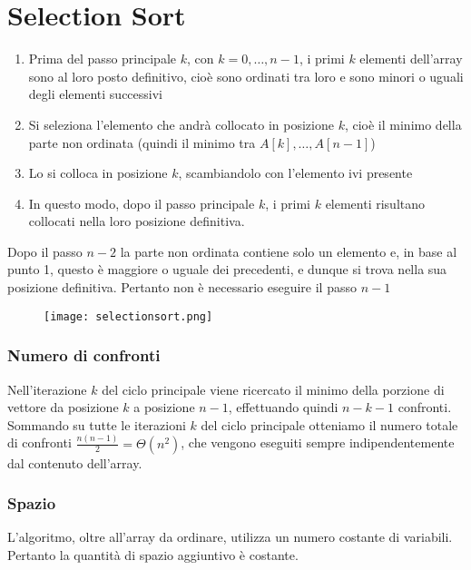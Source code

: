 \section{Selection Sort}
\begin{enumerate}
    \item Prima del passo principale $k$, con $k = 0,\dots, n - 1$, i primi 
    $k$ elementi dell'array sono al loro posto definitivo, cioè sono ordinati
    tra loro e sono minori o uguali degli elementi successivi

    \item Si seleziona l'elemento che andrà collocato in posizione $k$, cioè
    il minimo della parte non ordinata (quindi il minimo tra $A[k],\dots,A[n-1]$)

    \item Lo si colloca in posizione $k$, scambiandolo con l'elemento ivi presente
    \item In questo modo, dopo il passo principale $k$, i primi $k$ elementi
    risultano collocati nella loro posizione definitiva.
\end{enumerate}

\noindent Dopo il passo $n - 2$ la parte non ordinata contiene solo un elemento e, in base
al punto 1, questo è maggiore o uguale dei precedenti, e dunque si trova nella sua
posizione definitiva. Pertanto non è necessario eseguire il passo $n - 1$

\begin{figure}[h]
    \texttt{[image: selectionsort.png]}
    \centering
\end{figure}

\subsubsection*{Numero di confronti}
Nell'iterazione $k$ del ciclo principale viene ricercato il minimo della porzione di 
vettore da posizione $k$ a posizione $n - 1$, effettuando quindi $n-k-1$ confronti.
Sommando su tutte le iterazioni $k$ del ciclo principale otteniamo il numero totale
di confronti $\frac{n(n-1)}{2} = \Theta(n^2)$, che vengono eseguiti sempre indipendentemente dal
contenuto dell'array.

\subsubsection*{Spazio}
L'algoritmo, oltre all'array da ordinare, utilizza un numero costante di variabili.
Pertanto la quantità di spazio aggiuntivo è costante.
\clearpage